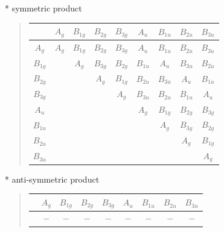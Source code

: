 \documentclass[fleqn,8pt,landscape]{jsarticle}
\begin{document}
* symmetric product
\begin{quote}
\begin{tabular}{c|cccccccc} \hline \hline
 & $ A_{g} $ & $ B_{1g} $ & $ B_{2g} $ & $ B_{3g} $ & $ A_{u} $ & $ B_{1u} $ & $ B_{2u} $ & $ B_{3u} $ \\ \hline
$ A_{g} $ & $ A_{g} $ & $ B_{1g} $ & $ B_{2g} $ & $ B_{3g} $ & $ A_{u} $ & $ B_{1u} $ & $ B_{2u} $ & $ B_{3u} $ \\
$ B_{1g} $ & $  $ & $ A_{g} $ & $ B_{3g} $ & $ B_{2g} $ & $ B_{1u} $ & $ A_{u} $ & $ B_{3u} $ & $ B_{2u} $ \\
$ B_{2g} $ & $  $ & $  $ & $ A_{g} $ & $ B_{1g} $ & $ B_{2u} $ & $ B_{3u} $ & $ A_{u} $ & $ B_{1u} $ \\
$ B_{3g} $ & $  $ & $  $ & $  $ & $ A_{g} $ & $ B_{3u} $ & $ B_{2u} $ & $ B_{1u} $ & $ A_{u} $ \\
$ A_{u} $ & $  $ & $  $ & $  $ & $  $ & $ A_{g} $ & $ B_{1g} $ & $ B_{2g} $ & $ B_{3g} $ \\
$ B_{1u} $ & $  $ & $  $ & $  $ & $  $ & $  $ & $ A_{g} $ & $ B_{3g} $ & $ B_{2g} $ \\
$ B_{2u} $ & $  $ & $  $ & $  $ & $  $ & $  $ & $  $ & $ A_{g} $ & $ B_{1g} $ \\
$ B_{3u} $ & $  $ & $  $ & $  $ & $  $ & $  $ & $  $ & $  $ & $ A_{g} $ \\
 \hline \hline
\end{tabular}
\end{quote}

* anti-symmetric product
\begin{quote}
\begin{tabular}{ccccccccc} \hline \hline
 & $ A_{g} $ & $ B_{1g} $ & $ B_{2g} $ & $ B_{3g} $ & $ A_{u} $ & $ B_{1u} $ & $ B_{2u} $ & $ B_{3u} $ \\ \hline
$  $ & $ - $ & $ - $ & $ - $ & $ - $ & $ - $ & $ - $ & $ - $ & $ - $ \\
 \hline \hline
\end{tabular}
\end{quote}
\end{document}

